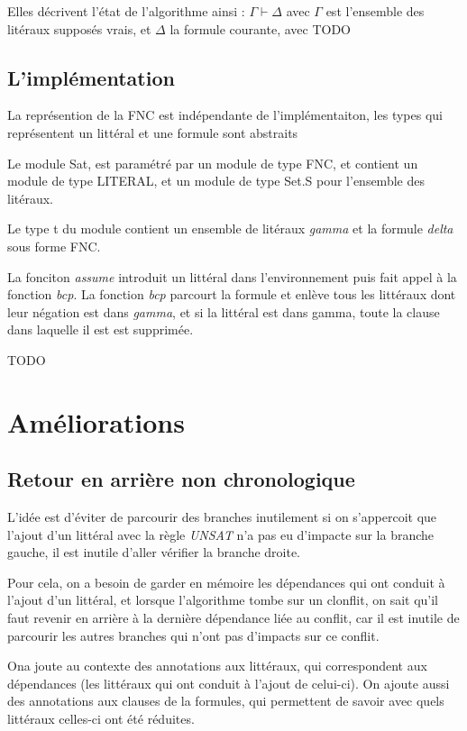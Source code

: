 \documentclass[a4paper, 10pt]{article}
\begin{document}
Elles décrivent l'état de l'algorithme ainsi :
$\Gamma \vdash \Delta$ avec $\Gamma$ est l'ensemble des litéraux
supposés vrais, et $\Delta$ la formule courante, avec TODO

\subsection{L'implémentation}

La représention de la FNC est indépendante de l'implémentaiton, les
types qui représentent un littéral et une formule sont abstraits

Le module Sat, est paramétré par un module de type FNC, et contient un
module de type LITERAL, et un module de type Set.S pour l'ensemble des
litéraux.

Le type t du module contient un ensemble de litéraux \emph{gamma} et
la formule \emph{delta} sous forme FNC.

La fonciton \emph{assume} introduit un littéral dans l'environnement
puis fait appel à la fonction \emph{bcp}.
La fonction \emph{bcp} parcourt la formule et enlève tous les littéraux
dont leur négation est dans \emph{gamma}, et si la littéral est dans
gamma, toute la clause dans laquelle il est est supprimée.

TODO

\section{Améliorations}
\subsection{Retour en arrière non chronologique}
L'idée est d'éviter de parcourir des branches inutilement si on
s'appercoit que l'ajout d'un littéral avec la règle \emph{UNSAT} n'a
pas eu d'impacte sur la branche gauche, il est inutile d'aller
vérifier la branche droite.

Pour cela, on a besoin de garder en mémoire les dépendances qui ont
conduit à l'ajout d'un littéral, et lorsque l'algorithme tombe sur un
clonflit, on sait qu'il faut revenir en arrière à la dernière
dépendance liée au conflit, car il est inutile de parcourir les autres
branches qui n'ont pas d'impacts sur ce conflit.

Ona joute au contexte des annotations aux littéraux, qui correspondent
aux dépendances (les littéraux qui ont conduit à l'ajout de celui-ci).
On ajoute aussi des annotations aux clauses de la formules, qui
permettent de savoir avec quels littéraux celles-ci ont été réduites.
\end{document}
